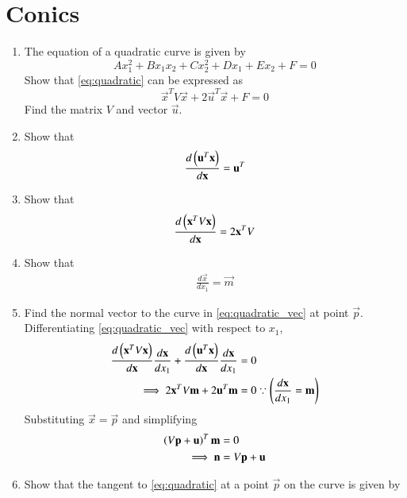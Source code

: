 \documentclass[journal,12pt,twocolumn]{IEEEtran}
\renewcommand\thesection{\arabic{section}}
\begin{document}
\section{Conics}
\begin{enumerate}[label=\thesection.\arabic*
,ref=\thesection.\theenumi]
\item The equation of a quadratic curve is given by
\begin{equation}
Ax_1^2+Bx_1x_2+Cx_2^2+Dx_1+Ex_2+F = 0
\label{eq:quadratic}
\end{equation}
%
Show that  \eqref{eq:quadratic} can be expressed as
\begin{equation}
\vec{x}^TV\vec{x}+2\vec{u}^T\vec{x}+ F = 0
\label{eq:quadratic_vec}
\end{equation}
%
Find the matrix $V$ and vector $\vec{u}$.
\item Show that 
\begin{align}
\frac{d\left(\mathbf{u}^T\mathbf{x}\right)}{d\mathbf{x}} = \mathbf{u}^T 
\end{align}
\item Show that 
\begin{align}
\frac{d\left(\mathbf{x}^TV\mathbf{x}\right)}{d\mathbf{x}} = 2\mathbf{x}^T V
\end{align}
\item Show that 
\begin{align}
\frac{d\vec{x}}{dx_1} = \vec{m}
\end{align}
%
\item Find the normal vector to the curve in \eqref{eq:quadratic_vec} at 
point $\vec{p}$.
\\
\solution Differentiating \eqref{eq:quadratic_vec} with respect to 
$x_1$,
\begin{align}
\frac{d\left(\mathbf{x}^TV\mathbf{x}\right)}{d\mathbf{x}}\frac{d\mathbf{x}}{dx_1}+\frac{d\left(\mathbf{u}^T\mathbf{x}\right)}{d\mathbf{x}}\frac{d\mathbf{x}}{dx_1}
&= 0
\\
\implies 2\mathbf{x}^TV\mathbf{m}+2\mathbf{u}^T\mathbf{m}
& = 0  \because \left(\frac{d\mathbf{x}}{dx_1} = \mathbf{m}\right)
\end{align}
Substituting  $\vec{x} = \vec{p}$ and simplifying
\begin{align}
\left( V\mathbf{p}+\mathbf{u}\right)^T\mathbf{m} & = 0 
\\
\implies \mathbf{n} &= V\mathbf{p}+\mathbf{u}
\end{align}
\item Show that the tangent to \eqref{eq:quadratic} at a point $\vec{p}$ on 
the curve is given by

\end{enumerate}
\end{document}
